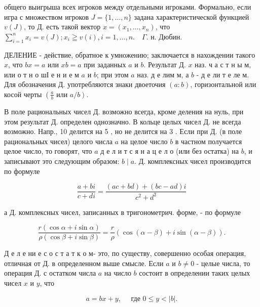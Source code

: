 \documentclass[10pt]{article}
\begin{document}
общего выигрыша всех игроков между отдельными игроками. Формально, если игра с множеством игроков $J=\{1, \ldots, n\}$ задана характеристической функцией $v(J)$, то Д. есть такой вектор $x=\left(x_{1}, \ldots, x_{n}\right)$, что $\sum_{i=1}^{n} x_{i}=v(J) ; x_{i} \geqq v(i), i=1, \ldots, n . \quad \Gamma$. н. Дюбин.



ДЕЛЕНИЕ - действие, обратное к умножению; заключается в нахождении такого $x$, что $b x=a$ или $x b=a$ при заданных $a$ и $b$. Результат Д. $x$ наз. ч а с т н ы м, или о т н о шІ е н и е м $a$ и $b$; при этом $a$ наз. д е лим м, а $b$ - д е ли т е ле м. Для обозначения Д. употребляются знаки двоеточия $(a: b)$, горизонтальной или косой черты $\left(\frac{a}{b}\right.$ или $\left.a / b\right)$.



В поле рациональных чисел Д. возможно всегда, кроме деления на нуль, при этом результат Д. определен однозначно. В кольце целых чисел Д. не всегда возможно. Напр., 10 делится на 5 , но не делится на 3 . Если при Д. (в поле рациональных чисел) целого числа $a$ на целое число $b$ в частном получается целое число, то говорят, что $a$ д е л и т с я н а ц е л о (или без остатка) на $b$, и записывают это следующим образом: $b \mid a$. Д. комплексных чисел производится по формуле



\[

\frac{a+b i}{c+d i}=\frac{(a c+b d)+(b c-a d) i}{c^{2}+d^{2}}

\]



а Д. комплексных чисел, записанных в тригонометрич. форме, - по формуле



\[

\frac{r(\cos \alpha+i \sin \alpha)}{\rho(\cos \beta+i \sin \beta)}=\frac{r}{\rho}(\cos (\alpha-\beta)+i \sin (\alpha-\beta)) .

\]



Д е л е ни е с о с т а т к о м- это, по существу, совершенно особая операция, отличная от Д. в определенном выше смысле. Если $a$ и $b \neq 0$ - целые числа, то операция Д. с остатком числа $a$ на число $b$ состоит в определении таких целых чисел $x$ и $y$, что



\[

a=b x+y, \quad \text { где } 0 \leqslant y<|b| .

\]
\end{document}
